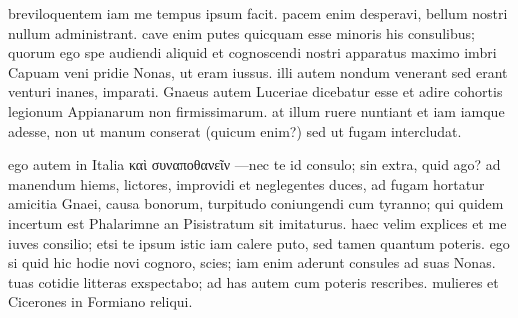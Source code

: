 


 breviloquentem iam me tempus ipsum facit. pacem enim desperavi, bellum nostri nullum administrant. cave enim putes quicquam esse minoris his consulibus; quorum ego spe audiendi aliquid et cognoscendi nostri apparatus maximo imbri Capuam veni pridie Nonas, ut eram iussus. illi autem nondum venerant sed erant venturi inanes, imparati. Gnaeus autem Luceriae dicebatur esse et adire cohortis legionum Appianarum non firmissimarum. at illum ruere nuntiant et iam iamque adesse, non ut manum conserat (quicum enim?) sed ut fugam intercludat.

 ego autem in Italia καὶ συναποθανεῖν —nec te id consulo; sin extra, quid ago? ad manendum hiems, lictores, improvidi et neglegentes duces, ad fugam hortatur amicitia Gnaei, causa bonorum, turpitudo coniungendi cum tyranno; qui quidem incertum est Phalarimne an Pisistratum sit imitaturus. haec velim explices et me iuves consilio; etsi te ipsum istic iam calere puto, sed tamen quantum poteris. ego si quid hic hodie novi cognoro, scies; iam enim aderunt consules ad suas Nonas. tuas cotidie litteras exspectabo; ad has autem cum poteris rescribes. mulieres et Cicerones in Formiano reliqui.
